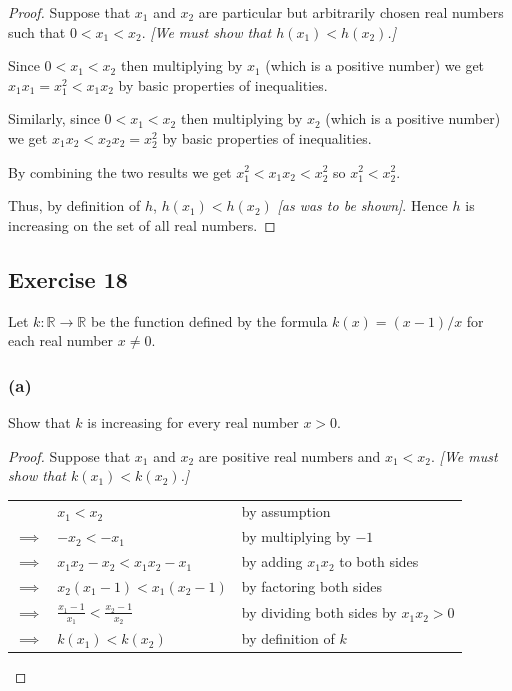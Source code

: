 \documentclass[14pt]{extarticle}
\newcommand{\dps}{\displaystyle}
\newcommand{\R}{\mathbb{R}}
\newcommand{\cy}{\color{cyan}}
\begin{document}
\begin{proof}
    Suppose that \(x_1\) and \(x_2\) are particular but arbitrarily chosen real numbers such that \(0 < x_1 < x_2\).
        {\it [We must show that \(h(x_1) < h(x_2)\).]}

    Since \(0 < x_1 < x_2\) then multiplying by \(x_1\) (which is a positive number) we get \(x_1x_1 = x_1^2 < x_1x_2\) by basic
    properties of inequalities.

    Similarly, since \(0 < x_1 < x_2\) then multiplying by \(x_2\) (which is a positive number) we get \(x_1x_2 < x_2x_2 =
    x_2^2\) by basic properties of inequalities.

    By combining the two results we get \(x_1^2 < x_1x_2 < x_2^2\) so \(x_1^2 < x_2^2\).

    Thus, by definition of \(h\), \(h(x_1) < h(x_2)\) {\it [as was to be shown]}. Hence \(h\) is increasing on the set of all
    real numbers.
\end{proof}

\subsection{Exercise 18}
Let \(k: \R \to \R\) be the function defined by the formula \(k(x) = (x - 1)/x\) for each real number \(x \neq 0\).

\subsubsection{(a)}
Show that \(k\) is increasing for every real number \(x > 0\).

\begin{proof}
    Suppose that \(x_1\) and \(x_2\) are positive real numbers and \(x_1 < x_2\). {\it [We must show that \(k(x_1) < k(x_2)\).]}

    \begin{center}
        \begin{tabular}{cll}
                         & \(x_1 < x_2\)                                      & {\cy by assumption}                            \\
            \(\implies\) & \(-x_2 < -x_1\)                                    & {\cy by multiplying by \(-1\)}                 \\
            \(\implies\) & \(x_1x_2 - x_2 < x_1x_2 - x_1\)                    & {\cy by adding \(x_1x_2\) to both sides}       \\
            \(\implies\) & \(x_2(x_1 - 1) < x_1(x_2 - 1)\)                    & {\cy by factoring both sides}                  \\
            \(\implies\) & \(\dps \frac{x_1 - 1}{x_1} < \frac{x_2 - 1}{x_2}\) & {\cy by dividing both sides by \(x_1x_2 > 0\)} \\
            \(\implies\) & \(k(x_1) < k(x_2)\)                                & {\cy by definition of \(k\)}
        \end{tabular}
    \end{center}

\end{proof}
\end{document}
